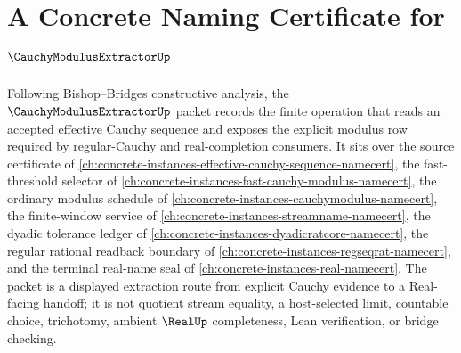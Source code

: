 \chapter{A Concrete Naming Certificate for $\CauchyModulusExtractorUp$}
\label{ch:concrete-instances-cauchy-modulus-extractor-namecert}

Following Bishop--Bridges constructive analysis, the $\CauchyModulusExtractorUp$ packet records the finite operation that reads an accepted effective Cauchy sequence and exposes the explicit modulus row required by regular-Cauchy and real-completion consumers. It sits over the source certificate of \autoref{ch:concrete-instances-effective-cauchy-sequence-namecert}, the fast-threshold selector of \autoref{ch:concrete-instances-fast-cauchy-modulus-namecert}, the ordinary modulus schedule of \autoref{ch:concrete-instances-cauchymodulus-namecert}, the finite-window service of \autoref{ch:concrete-instances-streamname-namecert}, the dyadic tolerance ledger of \autoref{ch:concrete-instances-dyadicratcore-namecert}, the regular rational readback boundary of \autoref{ch:concrete-instances-regseqrat-namecert}, and the terminal real-name seal of \autoref{ch:concrete-instances-real-namecert}. The packet is a displayed extraction route from explicit Cauchy evidence to a Real-facing handoff; it is not quotient stream equality, a host-selected limit, countable choice, trichotomy, ambient $\RealUp$ completeness, Lean verification, or bridge checking.

